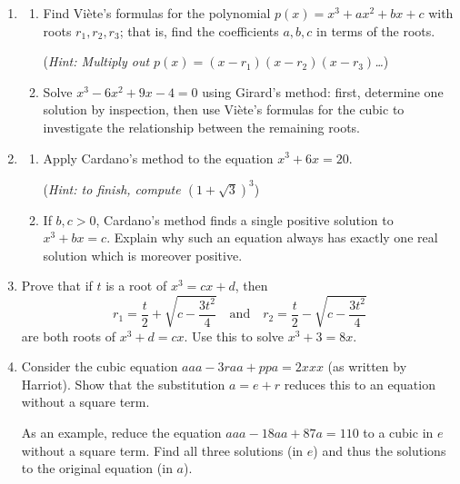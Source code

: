 \begin{exercises}{}{}
	\hangindent{}
	
	\begin{enumerate}
		\item\begin{enumerate}
	    \item Find Viète's formulas for the polynomial $p(x)=x^3+ax^2+bx+c$ with roots $r_1,r_2,r_3$; that is, find the coefficients $a,b,c$ in terms of the roots.\par
	    (\emph{Hint: Multiply out $p(x)=(x-r_1)(x-r_2)(x-r_3)$\ldots})
	    
	    
	    \item%
	  Solve $x^3-6x^2+9x-4=0$ using Girard's method: first, determine one solution by inspection, then use Viète's formulas for the cubic to investigate the relationship between the remaining roots.
	  \end{enumerate}
	  
		
			
		\item\begin{enumerate}
		  \item Apply Cardano's method to the equation $x^3+6x=20$.\par
		  (\emph{Hint: to finish, compute $(1+\sqrt 3)^3$})
			\item If $b,c>0$, Cardano's method finds a single positive solution to $x^3+bx=c$. Explain why such an equation always has exactly one real solution which is moreover positive.
		\end{enumerate}
		
		\item%
		Prove that if $t$ is a root of $x^3=cx+d$, then
		\[
			r_1=\frac t2+\sqrt{c-\frac{3t^2}4}
			\quad\text{and}\quad 
			r_2=\frac t2-\sqrt{c-\frac{3t^2}4}
		\]
		are both roots of $x^3+d=cx$. Use this to solve $x^3+3=8x$.
		
	
		\item%
		Consider the cubic equation $aaa-3raa+ppa=2xxx$ (as written by Harriot). Show that the substitution $a=e+r$ reduces this to an equation without a square term.\par
		As an example, reduce the equation $aaa-18aa+87a=110$ to a cubic in $e$ without a square term. Find all three solutions (in $e$) and thus the solutions to the original equation (in $a$).
		

\end{enumerate}
\end{exercises}
